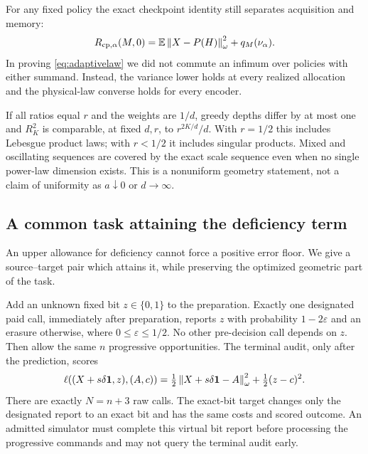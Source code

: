 For any fixed policy the exact checkpoint identity still separates acquisition and memory:
\begin{equation}\label{eq:policyspecific}
 R_{\mathrm{cp},\alpha}(M,0)
 =\mathbb E\left\lVert X-P(H)\right\rVert_\omega^2+q_M(\nu_\alpha).
\end{equation}
In proving \eqref{eq:adaptivelaw} we did not commute an infimum over policies with either summand. Instead, the variance lower holds at every realized allocation and the physical-law converse holds for every encoder.

If all ratios equal $r$ and the weights are $1/d$, greedy depths differ by at most one and $R_K^2$ is comparable, at fixed $d,r$, to $r^{2K/d}/d$. With $r=1/2$ this includes Lebesgue product laws; with $r<1/2$ it includes singular products. Mixed and oscillating sequences are covered by the exact scale sequence even when no single power-law dimension exists. This is a nonuniform geometry statement, not a claim of uniformity as $a\downarrow0$ or $d\to\infty$.

\subsection{A common task attaining the deficiency term}
An upper allowance for deficiency cannot force a positive error floor. We give a source--target pair which attains it, while preserving the optimized geometric part of the task.

Add an unknown fixed bit $z\in\{0,1\}$ to the preparation. Exactly one designated paid call, immediately after preparation, reports $z$ with probability $1-2\varepsilon$ and an erasure otherwise, where $0\le\varepsilon\le1/2$. No other pre-decision call depends on $z$. Then allow the same $n$ progressive opportunities. The terminal audit, only after the prediction, scores
\begin{equation}\label{eq:jointtask}
 \ell((X+s\delta\mathbf1,z),(A,c))
 =\tfrac12\left\lVert X+s\delta\mathbf1-A\right\rVert_\omega^2+\tfrac12(z-c)^2.
\end{equation}
There are exactly $N=n+3$ raw calls. The exact-bit target changes only the designated report to an exact bit and has the same costs and scored outcome. An admitted simulator must complete this virtual bit report before processing the progressive commands and may not query the terminal audit early.


